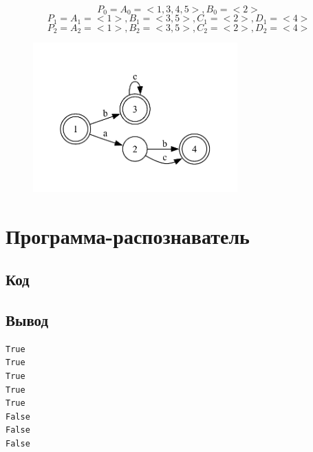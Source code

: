 \documentclass[12pt,onecolumn]{article}
\begin{document}
$$P_0 = { A_0 = <1,3,4,5>, B_0 = <2>}$$
$$P_1 = { A_1 = <1>, B_1 = <3,5>, C_1 = <2>, D_1 = <4>}$$
$$P_2 = { A_2 = <1>, B_2 = <3,5>, C_2 = <2>, D_2 = <4>}$$


\begin{figure}[H]
    \centering
    \includegraphics[width=0.7\textwidth]{abc-m.pdf}
\end{figure}
\section*{Программа-распознаватель}
\subsection*{Код}

\subsection*{Вывод}
\begin{verbatim}
True
True
True
True
True
False
False
False
\end{verbatim}
\end{document}

